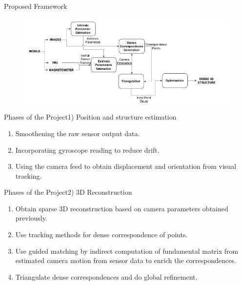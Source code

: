 \documentclass{beamer}
\begin{document}
\begin{frame}{Proposed Framework}{}
  \begin{figure}[ht!]
    \centering
    \includegraphics[width=\linewidth]{our_pipeline.png}
  \end{figure}
\end{frame}

\begin{frame}{Phases of the Project}{1) Position and structure estimation}
  \begin{enumerate}
        \item Smoothening the raw sensor output data.
        \item Incorporating gyroscope reading to reduce drift.
        \item Using the camera feed to obtain displacement and orientation from visual tracking.
  \end{enumerate}
\end{frame}
\begin{frame}{Phases of the Project}{2) 3D Reconstruction}
  \begin{enumerate}
        \item Obtain sparse 3D reconstruction based on camera parameters obtained previously.
        \item Use tracking methods for dense correspondence of points.
        \item Use guided matching by indirect computation of fundamental matrix from estimated camera motion from sensor data to enrich the correspondences.
        \item Triangulate dense correspondences and do global refinement. 
      \end{enumerate}
\end{frame}
\end{document}
